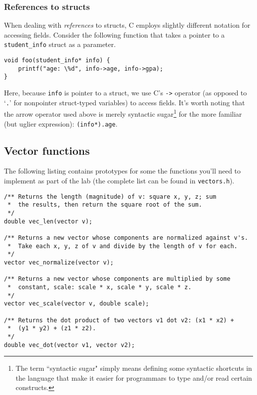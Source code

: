 \documentclass[12pt]{article}
\begin{document}
\subsubsection{References to structs}

When dealing with \textit{references} to structs, C employs slightly different notation for accessing fields. Consider the following function that takes a pointer to a \texttt{student\_info} struct as a parameter.

\begin{mdframed}[backgroundcolor=light-gray, innerleftmargin=10, innertopmargin=1,innerbottommargin=1,linecolor=light-gray]
\begin{lstlisting}
void foo(student_info* info) {
    printf("age: \%d", info->age, info->gpa);
}
\end{lstlisting}
\end{mdframed}

Here, because \texttt{info} is pointer to a struct, we use C's \texttt{->} operator (as opposed to `\texttt{.}' for nonpointer struct-typed variables) to access fields. It's worth noting that the arrow operator used above is merely syntactic sugar\footnote{The term ``syntactic sugar" simply means defining some syntactic shortcuts in the language that make it easier for programmars to type and/or read certain constructs.} for the more familiar (but uglier expression): \texttt{(info*).age}. 

\newpage
\subsection{Vector functions}

The following listing contains prototypes for some the functions you'll need to implement as part of the lab (the complete list can be found in \texttt{vectors.h}).

\begin{mdframed}[backgroundcolor=light-gray, innerleftmargin=10, innertopmargin=1,innerbottommargin=1,linecolor=light-gray]
\begin{lstlisting}
/** Returns the length (magnitude) of v: square x, y, z; sum
 *  the results, then return the square root of the sum.
 */
double vec_len(vector v);

/** Returns a new vector whose components are normalized against v's.
 *  Take each x, y, z of v and divide by the length of v for each.
 */
vector vec_normalize(vector v);

/** Returns a new vector whose components are multiplied by some 
 *  constant, scale: scale * x, scale * y, scale * z.
 */
vector vec_scale(vector v, double scale);
    
/** Returns the dot product of two vectors v1 dot v2: (x1 * x2) + 
 *  (y1 * y2) + (z1 * z2).
 */
double vec_dot(vector v1, vector v2);
\end{lstlisting}
\end{mdframed}
\end{document}
